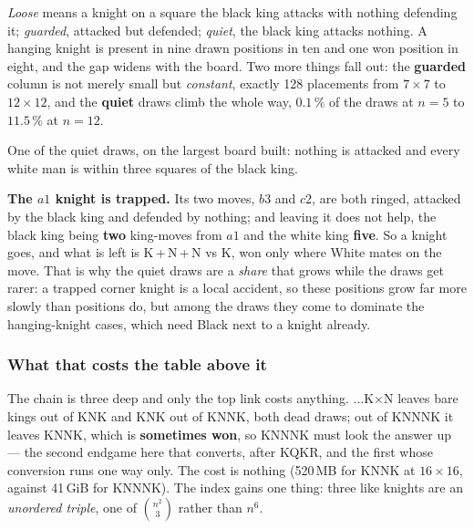 \documentclass[10pt]{article}
\begin{document}
\noindent
\emph{Loose} means a knight on a square the black king attacks with nothing
defending it; \emph{guarded}, attacked but defended; \emph{quiet}, the black
king attacks nothing. A hanging knight is present in nine drawn positions in
ten and one won position in eight, and the gap widens with the board. Two more
things fall out: the \textbf{guarded} column is not merely small but
\emph{constant}, exactly 128 placements from $7\times7$ to $12\times12$, and
the \textbf{quiet} draws climb the whole way, $0.1\,\%$ of the draws at $n=5$
to $11.5\,\%$ at $n=12$.

\medskip
\noindent
\begin{minipage}[t]{0.40\textwidth}
\end{minipage}\hfill
\begin{minipage}[t]{0.56\textwidth}\vspace{0pt}\small
One of the quiet draws, on the largest board built: nothing is attacked and
every white man is within three squares of the black king.

\smallskip
\textbf{The $a1$ knight is trapped.} Its two moves, $b3$ and $c2$, are both
ringed, attacked by the black king and defended by nothing; and leaving it does
not help, the black king being \textbf{two} king-moves from $a1$ and the white
king \textbf{five}. So a knight goes, and what is left is K\,+\,N\,+\,N vs K,
won only where White mates on the move. That is why the quiet draws are a
\emph{share} that grows while the draws get rarer: a trapped corner knight is a
local accident, so these positions grow far more slowly than positions do, but
among the draws they come to dominate the hanging-knight cases, which need
Black next to a knight already.
\end{minipage}

\subsubsection{What that costs the table above it}\label{sub:kn-cost}

\noindent
The chain is three deep and only the top link costs anything.
$\ldots$K$\times$N leaves bare kings out of KNK and KNK out of KNNK, both dead
draws; out of KNNNK it leaves KNNK, which is \textbf{sometimes won}, so KNNNK
must look the answer up --- the second endgame here that converts, after KQKR,
and the first whose conversion runs one way only. The cost is nothing (520\,MB
for KNNK at $16\times16$, against 41\,GiB for KNNNK). The index gains one
thing: three like knights are an \emph{unordered triple}, one of
$\binom{n^2}{3}$ rather than $n^6$.
\end{document}
